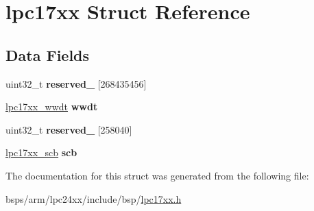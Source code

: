 \hypertarget{structlpc17xx}{}\section{lpc17xx Struct Reference}
\label{structlpc17xx}
\subsection*{Data Fields}
\begin{DoxyCompactItemize}
\item 
\mbox{\label{structlpc17xx_a8b9c01aacef57ef57a263be340245f30}} 
uint32\+\_\+t {\bfseries reserved\+\_} \mbox{[}268435456\mbox{]}
\item 
\mbox{\label{structlpc17xx_a863617852e06981190604ff1e671351d}} 
\mbox{\hyperlink{structlpc17xx__wwdt}{lpc17xx\+\_\+wwdt}} {\bfseries wwdt}
\item 
\mbox{\label{structlpc17xx_a0667ecdcc7e1baf6b48ba1da6820e000}} 
uint32\+\_\+t {\bfseries reserved\+\_} \mbox{[}258040\mbox{]}
\item 
\mbox{\label{structlpc17xx_a6a8d9f79cd12f2aac0a44f77562e412f}} 
\mbox{\hyperlink{structlpc17xx__scb}{lpc17xx\+\_\+scb}} {\bfseries scb}
\end{DoxyCompactItemize}


The documentation for this struct was generated from the following file\+:\begin{DoxyCompactItemize}
\item 
bsps/arm/lpc24xx/include/bsp/\mbox{\hyperlink{lpc17xx_8h}{lpc17xx.\+h}}\end{DoxyCompactItemize}
